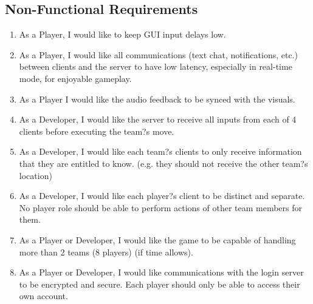 \subsection*{Non-Functional Requirements}
\begin{enumerate}[resume, leftmargin=\listmargin]
\item As a Player, I would like to keep GUI input delays low.
\item As a Player, I would like all communications (text chat, notifications, etc.) between clients and the server to have low latency, especially in real-time mode, for enjoyable gameplay.
\item As a Player I would like the audio feedback to be synced with the visuals.
\item As a Developer, I would like the server to receive all inputs from each of 4 clients before executing the team?s move.
\item As a Developer, I would like each team?s clients to only receive information that they are entitled to know. (e.g. they should not receive the other team?s location)
\item As a Developer, I would like each player?s client to be distinct and separate. No player role should be able to perform actions of other team members for them.
\item As a Player or Developer, I would like the game to be capable of handling more than 2 teams (8 players) (if time allows).
\item As a Player or Developer, I would like communications with the login server to be encrypted and secure. Each player should only be able to access their own account.
\end{enumerate}
